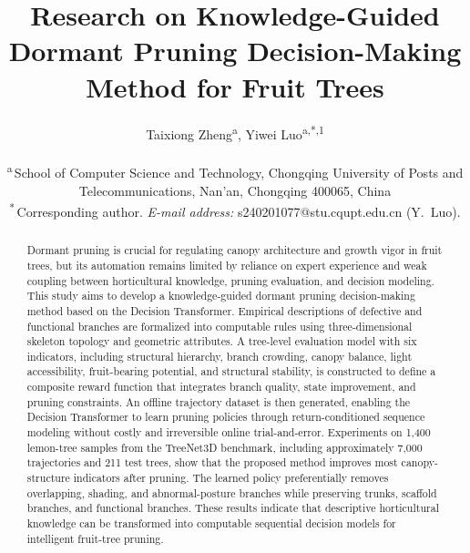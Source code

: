 \documentclass[12pt,a4paper,fontset=fandol]{ctexart}
\title{Research on Knowledge-Guided Dormant Pruning Decision-Making Method for Fruit Trees}
\author{%
  Taixiong Zheng\textsuperscript{a}, Yiwei Luo\textsuperscript{a,*,1}\\[6pt]
  \begin{minipage}{0.85\textwidth}\centering
    \small\textsuperscript{a}\,School of Computer Science and Technology, Chongqing University of Posts and Telecommunications, Nan'an, Chongqing 400065, China\\[4pt]
    \footnotesize\textsuperscript{*}\,Corresponding author. \textit{E-mail address:} s240201077@stu.cqupt.edu.cn (Y.~Luo).
  \end{minipage}%
}
\date{}
\begin{document}
\linenumbers
\pagestyle{plain}

\maketitle
\begingroup
\renewcommand{\thefootnote}{1}%
%
\endgroup

\begin{abstract}
\small
Dormant pruning is crucial for regulating canopy architecture and growth vigor in fruit trees, but its automation remains limited by reliance on expert experience and weak coupling between horticultural knowledge, pruning evaluation, and decision modeling. This study aims to develop a knowledge-guided dormant pruning decision-making method based on the Decision Transformer. Empirical descriptions of defective and functional branches are formalized into computable rules using three-dimensional skeleton topology and geometric attributes. A tree-level evaluation model with six indicators, including structural hierarchy, branch crowding, canopy balance, light accessibility, fruit-bearing potential, and structural stability, is constructed to define a composite reward function that integrates branch quality, state improvement, and pruning constraints. An offline trajectory dataset is then generated, enabling the Decision Transformer to learn pruning policies through return-conditioned sequence modeling without costly and irreversible online trial-and-error. Experiments on 1,400 lemon-tree samples from the TreeNet3D benchmark, including approximately 7,000 trajectories and 211 test trees, show that the proposed method improves most canopy-structure indicators after pruning. The learned policy preferentially removes overlapping, shading, and abnormal-posture branches while preserving trunks, scaffold branches, and functional branches. These results indicate that descriptive horticultural knowledge can be transformed into computable sequential decision models for intelligent fruit-tree pruning.

\vspace{0.5\baselineskip}
\end{abstract}
\end{document}
